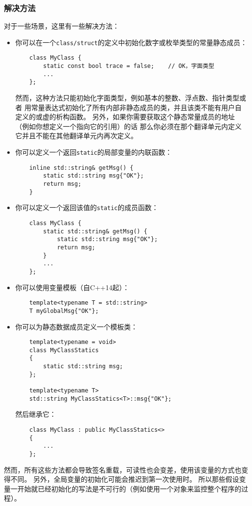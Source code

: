 \subsubsection*{解决方法}
对于一些场景，这里有一些解决方法：
\begin{itemize}[leftmargin=*]
    \item 你可以在一个\texttt{class/struct}的定义中初始化数字或枚举类型的常量静态成员：
    \begin{lstlisting}
    class MyClass {
        static const bool trace = false;    // OK，字面类型
        ...
    };
    \end{lstlisting}
    然而，这种方法只能初始化字面类型，例如基本的整数、浮点数、指针类型或者
    用常量表达式初始化了所有内部非静态成员的类，并且该类不能有用户自定义的或虚的析构函数。
    另外，如果你需要获取这个静态常量成员的地址（例如你想定义一个指向它的引用）的话
    那么你必须在那个翻译单元内定义它并且不能在其他翻译单元内再次定义。
    \item 你可以定义一个返回\texttt{static}的局部变量的内联函数：
    \begin{lstlisting}
    inline std::string& getMsg() {
        static std::string msg{"OK"};
        return msg;
    }
    \end{lstlisting}
    \item 你可以定义一个返回该值的\texttt{static}的成员函数：
    \begin{lstlisting}
    class MyClass {
        static std::string& getMsg() {
            static std::string msg{"OK"};
            return msg;
        }
        ...
    };
    \end{lstlisting}
    \item 你可以使用变量模板（自C++14起）：
    \begin{lstlisting}
    template<typename T = std::string>
    T myGlobalMsg{"OK"};
    \end{lstlisting}
    \item 你可以为静态数据成员定义一个模板类：
    \begin{lstlisting}
    template<typename = void>
    class MyClassStatics
    {
        static std::string msg;
    };

    template<typename T>
    std::string MyClassStatics<T>::msg{"OK"};
    \end{lstlisting}
    然后继承它：
    \begin{lstlisting}
    class MyClass : public MyClassStatics<>
    {
        ...
    };
    \end{lstlisting}
\end{itemize}
然而，所有这些方法都会导致签名重载，可读性也会变差，使用该变量的方式也变得不同。
另外，全局变量的初始化可能会推迟到第一次使用时。
所以那些假设变量一开始就已经初始化的写法是不可行的（例如使用一个对象来监控整个程序的过程）。

